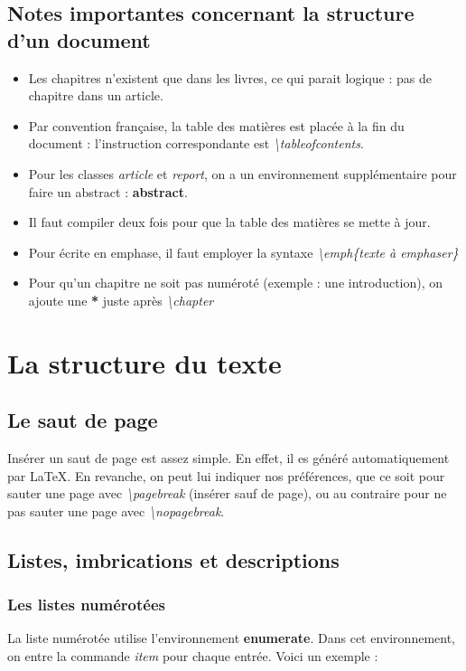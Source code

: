 \documentclass[a4paper, 10pt]{book}
\begin{document}
\subsection{Notes importantes concernant la structure d'un document}

\begin{itemize}
\item Les chapitres n'existent que dans les livres, ce qui parait logique : pas de chapitre dans un article.
\item Par convention française, la table des matières est placée à la fin du document : l'instruction correspondante est \textit{\textbackslash tableofcontents}.
\item Pour les classes \textit{article} et \textit{report}, on a un environnement supplémentaire pour faire un abstract : \textbf{abstract}.
\item Il faut compiler deux fois pour que la table des matières se mette à jour.
\item Pour écrite en emphase, il faut employer la syntaxe \textit{\textbackslash emph\{texte à emphaser\}}
\item Pour qu'un chapitre ne soit pas numéroté (exemple : une introduction), on ajoute une \textbf{*} juste après \textit{\textbackslash  chapter}
\end{itemize}

\section{La structure du texte}
\subsection{Le saut de page}
Insérer un saut de page est assez simple. En effet, il es généré automatiquement par \LaTeX . En revanche, on peut lui indiquer nos préférences, que ce soit pour sauter une page avec \textit{\textbackslash pagebreak} (insérer sauf de page), ou au contraire pour ne pas sauter une page avec \textit{\textbackslash nopagebreak}.

\subsection{Listes, imbrications et descriptions}
\subsubsection{Les listes numérotées}
La liste numérotée utilise l'environnement \textbf{enumerate}. Dans cet environnement, on entre la commande \textit{item} pour chaque entrée. Voici un exemple : 
\end{document}
